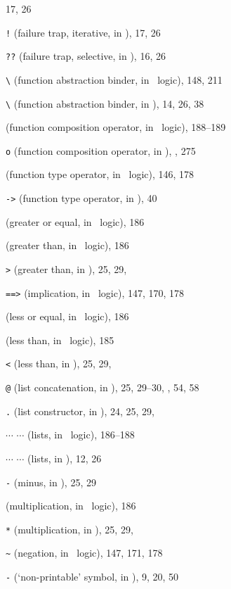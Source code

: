 \begin{theindex}
		17, 26
  \item {\small\verb+!+} (failure trap, iterative, in \ML), 17, 26
  \item {\small\verb+??+} (failure trap, selective, in \ML), 16, 26
  \item {\small\verb+\+} (function abstraction binder, in \HOL\ logic), 
		148, 211
  \item {\small\verb+\+} (function abstraction binder, in \ML), 14, 26, 
		38
  \item {} (function composition operator, in \HOL\ logic), 
		188--189
  \item {\small\verb+o+} (function composition operator, in \ML), 
		, 275
  \item \ml{->} (function type operator, in \HOL\ logic), 146, 178
  \item {\small\verb+->+} (function type operator, in \ML), 40
  \item \ml{>=} (greater or equal, in \HOL\ logic), 186
  \item \ml{>} (greater than, in \HOL\ logic), 186
  \item {\small\verb+>+} (greater than, in \ML), 25, 29, 
  \item {\small\verb+==>+} (implication, in \HOL\ logic), 147, 170, 178
  \item \ml{<=} (less or equal, in \HOL\ logic), 186
  \item \ml{<} (less than, in \HOL\ logic), 185
  \item {\small\verb+<+} (less than, in \ML), 25, 29, 
  \item {\small\verb+@+} (list concatenation, in \ML), 25, 29--30, 
		, 54, 58
  \item {\small\verb+.+} (list constructor, in \ML), 24, 25, 29, 
  \item \ml{[} $\cdots$ \ml{;} $\cdots$ \ml{]} (lists, in \HOL\ logic), 
		186--188
  \item {\small\ml{[} $\cdots$ \ml{;} $\cdots$ \ml{]}} (lists, in \ML), 
		12, 26
  \item {\small\verb+-+} (minus, in \ML), 25, 29
  \item \ml{*} (multiplication, in \HOL\ logic), 186
  \item {\small\verb+*+} (multiplication, in \ML), 25, 29, 
  \item {\small\verb+~+} (negation, in \HOL\ logic), 147, 171, 178
  \item {\small\verb+-+} (`non-printable' symbol, in \ML), 9, 20, 50

\end{theindex}
